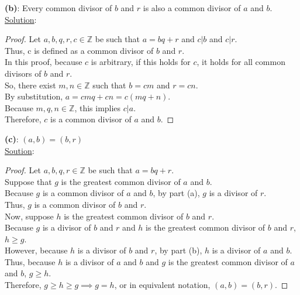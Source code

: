 \documentclass{article} %
\begin{document}
\begin{addmargin}[1em]{0em}
\textbf{(b)}: Every common divisor of $b$ and $r$ is also a common divisor of $a$ and $b$.
\\ \hfill \break
\underline{Solution}:
\begin{addmargin}[1em]{0em}
\begin{proof}
Let $a, b, q, r, c \in \mathbb{Z}$ be such that $a = bq + r$ and $c|b$ and $c|r$.
\\Thus, c is defined as a common divisor of $b$ and $r$.
\\In this proof, because $c$ is arbitrary, if this holds for $c$, it holds for all common divisors of $b$ and $r$.
\\So, there exist $m,n \in \mathbb{Z}$ such that $b = cm$ and $r = cn$.
\\By substitution, $a = cmq + cn = c(mq + n)$.
\\Because $m,q,n \in \mathbb{Z}$, this implies $c|a$.
\\Therefore, $c$ is a common divisor of $a$ and $b$.
\end{proof}
\end{addmargin}
\end{addmargin}
\hfill \break

\begin{addmargin}[1em]{0em}
\textbf{(c)}: $(a,b)=(b,r)$
\\ \hfill \break
\underline{Soution}:
\begin{addmargin}[1em]{0em}
\begin{proof}
Let $a, b, q, r \in \mathbb{Z}$ be such that $a = bq + r$.
\\Suppose that $g$ is the greatest common divisor of $a$ and $b$.
\\Because $g$ is a common divisor of $a$ and $b$, by part (a), $g$ is a divisor of $r$.
\\Thus, $g$ is a common divisor of $b$ and $r$.
\\Now, suppose $h$ is the greatest common divisor of $b$ and $r$.
\\Because $g$ is a divisor of $b$ and $r$ and $h$ is the greatest common divisor of $b$ and $r$, $h \geq g$.
\\However, because $h$ is a divisor of $b$ and $r$, by part (b), $h$ is a divisor of $a$ and $b$.
\\Thus, because $h$ is a divisor of $a$ and $b$ and $g$ is the greatest common divisor of $a$ and $b$, $g \geq h$.
\\Therefore, $g \geq h \geq g \implies g = h$, or in equivalent notation, $(a,b) = (b,r)$.
\end{proof}
\end{addmargin}
\end{addmargin}
\end{document}
